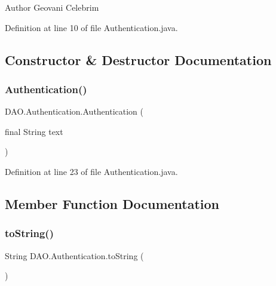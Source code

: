 \begin{DoxyAuthor}{Author}
Geovani Celebrim 
\end{DoxyAuthor}


Definition at line 10 of file Authentication.\+java.



\subsection{Constructor \& Destructor Documentation}
\hypertarget{enumDAO_1_1Authentication_ae2aa2fbece2d43b0558d014e074af952}{}\label{enumDAO_1_1Authentication_ae2aa2fbece2d43b0558d014e074af952} 
\subsubsection{\texorpdfstring{Authentication()}{Authentication()}}
{\footnotesize\ttfamily D\+A\+O.\+Authentication.\+Authentication (\begin{DoxyParamCaption}\item[{final String}]{text }\end{DoxyParamCaption})\hspace{0.3cm}{\ttfamily [private]}}



Definition at line 23 of file Authentication.\+java.



\subsection{Member Function Documentation}
\hypertarget{enumDAO_1_1Authentication_aee2343f1f01c93f403d8a768bfb6c3ab}{}\label{enumDAO_1_1Authentication_aee2343f1f01c93f403d8a768bfb6c3ab} 
\subsubsection{\texorpdfstring{to\+String()}{toString()}}
{\footnotesize\ttfamily String D\+A\+O.\+Authentication.\+to\+String (\begin{DoxyParamCaption}{ }\end{DoxyParamCaption})}

